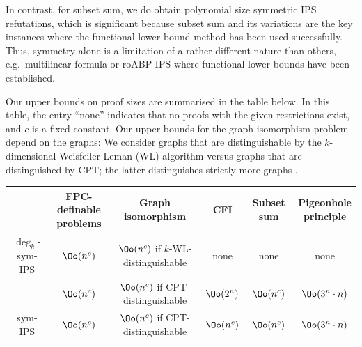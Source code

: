 \documentclass[a4paper,UKenglish,cleveref, autoref, thm-restate]{lipics-v2021}
\newcommand{\symIPSlin}{\text{ \upshape sym-IPS}_{\mathsf{LIN}}}
\begin{document}
	In contrast, for subset sum, we do obtain polynomial size symmetric IPS refutations, which is significant because subset sum and its variations are the key instances where the functional lower bound method \cite{lowerbounds_IPS, govindasamy2022simple, hakoniemi2024functional} has been used successfully. Thus, symmetry alone is a limitation of a rather different nature than others, e.g.\ multilinear-formula or roABP-IPS where functional lower bounds have been established. 
	
	Our upper bounds on proof sizes are summarised in the table below. In this table, the entry ``none'' indicates that no proofs with the given restrictions exist, and $c$ is a fixed constant. Our upper bounds for the graph isomorphism problem depend on the graphs: 
	We consider graphs that are distinguishable by the $k$-dimensional Weisfeiler Leman (WL) algorithm versus graphs that are distinguished by CPT; the latter distinguishes strictly more graphs \cite{dawar2008}.
	\begin{table}[h]
		\centering
		\begin{tabular}{c|c|c|c|c|c}
			&\makecell{\textbf{FPC-definable}\\ \textbf{problems}} &\makecell{\textbf{Graph}\\ \textbf{isomorphism}} & \textbf{CFI} & \textbf{Subset sum} & \makecell{\textbf{Pigeonhole}\\ \textbf{principle}}\\
			\hline
			$\deg_k$-sym-IPS & $\Oo(n^c)$ & \makecell{$\Oo(n^c)$ if $k$-WL-\\ distinguishable} & none & none & none\\
			\hline
			\makecell{$\symIPSlin$} & $\Oo(n^c)$ & \makecell{$\Oo(n^c)$ if CPT-\\ distinguishable}& $\Oo(2^n)$ & $\Oo(n^c)$ & $\Oo(3^n \cdot n)$ \\
			\hline
			sym-IPS & $\Oo(n^c)$ & \makecell{$\Oo(n^c)$ if CPT-\\ distinguishable} & $\Oo(n^c)$ & $\Oo(n^c)$ & $\Oo(3^n \cdot n)$
		\end{tabular}
	\end{table}	
\end{document}
